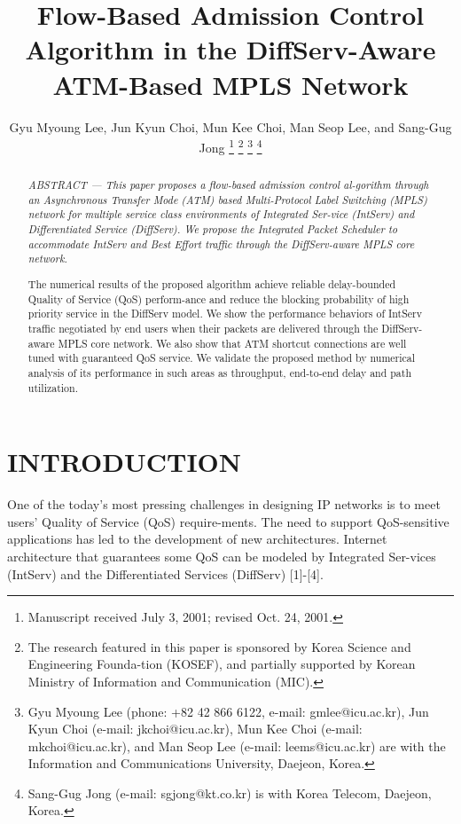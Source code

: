 \documentclass[10pt, twocolumn, twoside]{etri}
\begin{document}
\title{Flow-Based Admission Control Algorithm in the DiffServ-Aware ATM-Based
MPLS Network}
\author{Gyu Myoung Lee, Jun Kyun Choi, Mun Kee Choi, Man Seop Lee, and
Sang-Gug Jong%
\thanks{Manuscript received July 3, 2001; revised Oct. 24, 2001.}%
\thanks{The research featured in this paper is sponsored by Korea Science and
Engineering Founda-tion (KOSEF), and partially supported by Korean Ministry of
Information and Communication (MIC).}%
\thanks{Gyu Myoung Lee (phone: +82 42 866 6122, e-mail: gmlee@icu.ac.kr),
Jun Kyun Choi (e-mail: jkchoi@icu.ac.kr), Mun Kee Choi (e-mail:
mkchoi@icu.ac.kr), and Man Seop Lee (e-mail: leems@icu.ac.kr) are with the
Information and Communications University, Daejeon, Korea.}%
\thanks{Sang-Gug Jong (e-mail: sgjong@kt.co.kr) is with Korea Telecom, Daejeon,
Korea.}%
}

\maketitle

\begin{abstract}
\itshape
ABSTRACT ---
This paper proposes a flow-based admission control al-gorithm through an
Asynchronous Transfer Mode (ATM) based Multi-Protocol Label Switching
(MPLS) network for multiple service class environments of Integrated
Ser-vice (IntServ) and Differentiated Service (DiffServ). We propose
the Integrated Packet Scheduler to accommodate IntServ and Best Effort
traffic through the DiffServ-aware MPLS core network.

The numerical results of the proposed algorithm achieve reliable
delay-bounded Quality of Service (QoS) perform-ance and reduce the
blocking probability of high priority service in the DiffServ model. We
show the performance behaviors of IntServ traffic negotiated by end users
when their packets are delivered through the DiffServ-aware MPLS core
network. We also show that ATM shortcut connections are well tuned with
guaranteed QoS service. We validate the proposed method by numerical
analysis of its performance in such areas as throughput, end-to-end
delay and path utilization.
\end{abstract}

\section{INTRODUCTION}

One\cite{One} of the today's most pressing challenges in designing IP networks
is to meet users' Quality of Service (QoS) require-ments. The need to
support QoS-sensitive applications has led to the development of new
architectures. Internet architecture that guarantees some QoS can be
modeled by Integrated Ser-vices (IntServ) and the Differentiated Services
(DiffServ) [1]-[4].
\end{document}

